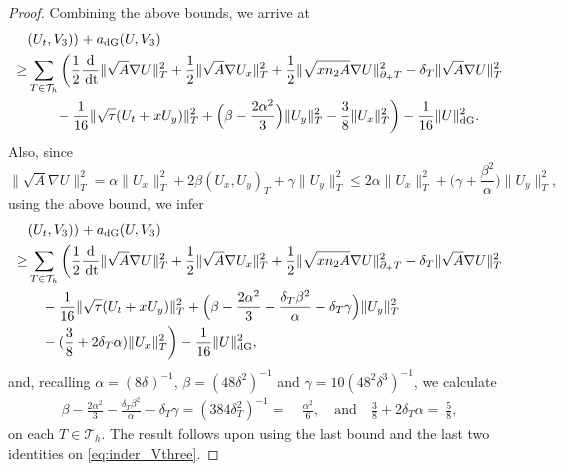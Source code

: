 \documentclass{amsart}
\newcommand{\norm}[2]{\|{#1}\|_{{#2}}}
\newcommand{\dee}{{\rm d}}
\newcommand{\inner}[3]{({#1},{#2})_{{#3}}}
\newcommand{\Th}{\mathcal{T}_h}
\newcommand{\normal}{{n}}
\newcommand{\dt}{\,{\rm dt}}
\theoremstyle{definition}
\theoremstyle{remark}
\numberwithin{equation}{section}
\begin{document}
\begin{proof}
	Combining the above bounds, we arrive at
\begin{equation}\label{eq:inder_Vthree}
	\begin{aligned}
			&     \inner{U_t}{V_3)}{}  +    a_{\rm dG}(U,V_3) \\
		\geq
	&		\sum_{T \in \Th} \bigg(
		\frac{1}{2} \frac{\dee}{\dt} \norm{\sqrt{A} \nabla U}{T}^2
		+
	\frac{1}{2}  \norm{\sqrt{A}\nabla U_x}{T}^2+	\frac{1}{2} \norm{ \sqrt{x\normal_2 A}\nabla U }{\partial_+ T}^2- \delta_T\norm{\sqrt{A}\nabla U}{T}^2
		\\
	&\qquad	-			\frac{1}{16}	\norm{ \sqrt{\tau} (U_t+ x U_y)}{T}^2
		+ \Big(\beta-\frac{2\alpha^2}{3}\Big)\norm{U_y}{T}^2	-	\frac{3}{8} \norm{U_x}{T} ^2\bigg)	-\frac{1}{16}\norm{U}{\rm dG}^2.
	\end{aligned}
\end{equation}
Also, since
\[
\|\sqrt{A}\nabla U\|_T^2= \alpha \|U_x\|_T^2+ 2\beta (U_x, U_y)_T + \gamma \|U_y\|_T^2\le  2\alpha \|U_x\|_T^2+\Big( \gamma + \frac{\beta^2}{\alpha }\Big) \|U_y\|_T^2,
\]
 {using the above bound, we infer
\[
	\begin{aligned}
			&     \inner{U_t}{V_3)}{}  +    a_{\rm dG}(U,V_3) \\
		\geq
	&		\sum_{T \in \Th} \bigg(
		\frac{1}{2} \frac{\dee}{\dt} \norm{\sqrt{A} \nabla U}{T}^2
		+
	\frac{1}{2}  \norm{\sqrt{A}\nabla U_x}{T}^2+	\frac{1}{2} \norm{ \sqrt{x\normal_2 A}\nabla U }{\partial_+ T}^2- \delta_T\norm{\sqrt{A}\nabla U}{T}^2
		\\
	&\quad	-			\frac{1}{16}	\norm{ \sqrt{\tau} (U_t+ x U_y)}{T}^2
		+ \Big(	\beta -\frac{2\alpha^2}{3} - \frac{\delta_T \beta^2}{\alpha} -\delta_T \gamma\Big)\norm{U_y}{T}^2
\\	&\quad 	-	(\frac{3}{8} +2\delta_T \alpha) \norm{U_x}{T} ^2\bigg)
-\frac{1}{16}\norm{U}{\rm dG}^2,
	\end{aligned}
\]}
and, 	recalling $\alpha = (8\delta)^{-1}$, $\beta = (48\delta^2)^{-1}$ and $\gamma = 10(48^2\delta^3)^{-1}$, we calculate
	\begin{equation*}\begin{split}
		\beta -\frac{2\alpha^2}{3} - \frac{\delta_T \beta^2}{\alpha} -\delta_T \gamma
		=
		(384 \delta_T^2)^{-1} =&\ \frac{\alpha^2}{6}, \quad\text{and}\quad
		 \frac{3}{8 }  +2\delta_T \alpha =\ \frac{5}{8},
\end{split}\end{equation*}
on each $T\in\Th$.
The result follows upon using the last bound and the last two identities on \eqref{eq:inder_Vthree}.
\end{proof}
\end{document}
